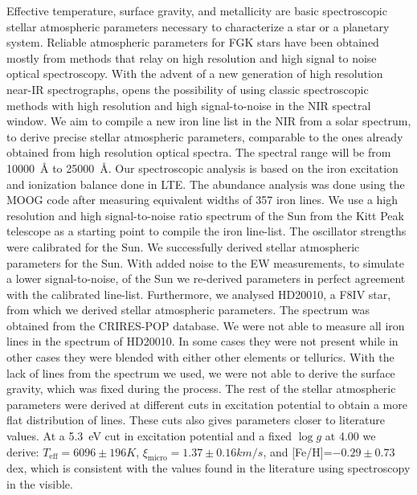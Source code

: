 \documentclass{aa}
\begin{document}
\abstract
{Effective temperature, surface gravity, and metallicity are basic
spectroscopic stellar atmospheric parameters necessary to characterize
a star or a planetary system. Reliable atmospheric parameters for
FGK stars have been obtained mostly from methods that relay on high
resolution and high signal to noise optical spectroscopy. With the
advent of a new generation of high resolution near-IR spectrographs,
opens the possibility of using classic spectroscopic methods with
high resolution and high signal-to-noise in the NIR spectral window.}
{We aim to compile a new iron line list in the NIR from a solar
spectrum, to derive precise stellar atmospheric parameters,
comparable to the ones already obtained from high resolution optical
spectra. The spectral range will be from \SI{10000}{\angstrom} to
\SI{25000}{\angstrom}.}
{Our spectroscopic analysis is based on the iron excitation and
ionization balance done in LTE. The abundance analysis was done using the MOOG code
after measuring equivalent widths of 357 iron lines. We use a high
resolution and high signal-to-noise ratio spectrum of the Sun from the
Kitt Peak telescope as a starting point to compile
the iron line-list. The oscillator strengths were calibrated for the
Sun.}
{We successfully derived stellar atmospheric parameters for the Sun.
With added noise to the EW measurements, to simulate a lower signal-to-noise,
of the Sun we re-derived
parameters in perfect agreement with the calibrated line-list.
Furthermore, we analysed HD20010, a F8IV star, from which we derived
stellar atmospheric parameters. The spectrum was obtained from the
CRIRES-POP database. We were not able to measure all iron lines in
the spectrum of HD20010. In some cases they were not present while in
other cases they were blended with either other elements or tellurics.
With the lack of  lines from the spectrum we used, we were
not able to derive the surface gravity, which was fixed during the
process. The rest of the stellar atmospheric parameters were derived at
different cuts in excitation potential to obtain a more flat distribution
of lines. These cuts also gives parameters closer
to literature values. At a \SI{5.3}{eV} cut in excitation potential
and a fixed $\log g$ at 4.00 we derive: $T_\mathrm{eff}=6096\pm196\si{K}$,
$\xi_\mathrm{micro}=1.37\pm0.16\si{km/s}$, and [Fe/H]=$-0.29\pm0.73$
dex, which is consistent with the values found in the literature using
spectroscopy in the visible.}
{}
\end{document}

